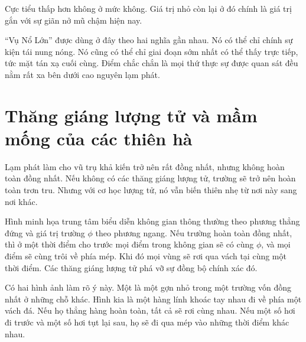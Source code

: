 Cực tiểu thấp hơn không ở mức không. Giá trị nhỏ còn lại ở đó chính là giá trị gắn với sự giãn nở mũ chậm hiện nay.

\begin{classroomqa}
\end{classroomqa}

``Vụ Nổ Lớn'' được dùng ở đây theo hai nghĩa gần nhau. Nó có thể chỉ chính sự kiện tái nung nóng. Nó cũng có thể chỉ giai đoạn sớm nhất có thể thấy trực tiếp, tức mặt tán xạ cuối cùng. Điểm chắc chắn là mọi thứ thực sự được quan sát đều nằm rất xa bên dưới cao nguyên lạm phát.

\begin{classroomqa}
\end{classroomqa}

\section{Thăng giáng lượng tử và mầm mống của các thiên hà}

Lạm phát làm cho vũ trụ khả kiến trở nên rất đồng nhất, nhưng không hoàn toàn đồng nhất. Nếu không có các thăng giáng lượng tử, trường sẽ trở nên hoàn toàn trơn tru. Nhưng với cơ học lượng tử, nó vẫn biến thiên nhẹ từ nơi này sang nơi khác.

Hình minh họa trung tâm biểu diễn không gian thông thường theo phương thẳng đứng và giá trị trường \(\phi\) theo phương ngang. Nếu trường hoàn toàn đồng nhất, thì ở một thời điểm cho trước mọi điểm trong không gian sẽ có cùng \(\phi\), và mọi điểm sẽ cùng trôi về phía mép. Khi đó mọi vùng sẽ rơi qua vách tại cùng một thời điểm. Các thăng giáng lượng tử phá vỡ sự đồng bộ chính xác đó.

Có hai hình ảnh làm rõ ý này. Một là một gợn nhỏ trong một trường vốn đồng nhất ở những chỗ khác. Hình kia là một hàng lính khoác tay nhau đi về phía một vách đá. Nếu họ thẳng hàng hoàn toàn, tất cả sẽ rơi cùng nhau. Nếu một số hơi đi trước và một số hơi tụt lại sau, họ sẽ đi qua mép vào những thời điểm khác nhau.

